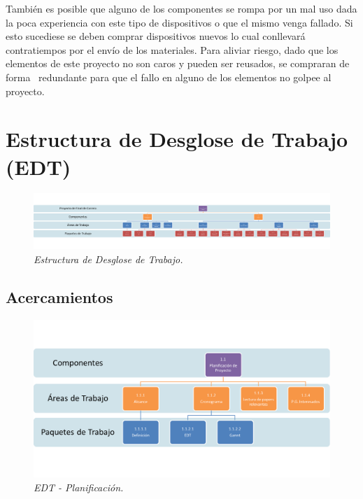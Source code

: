 También es posible que alguno de los componentes se rompa por un mal uso dada la poca experiencia con este tipo de dispositivos o que el mismo venga fallado. Si esto sucediese se deben comprar dispositivos nuevos lo cual conllevará contratiempos por el envío de los materiales. Para aliviar riesgo, dado que los elementos de este proyecto no son caros y pueden ser reusados, se compraran de forma  redundante para que el fallo en alguno de los elementos no golpee al proyecto.

\section{Estructura de Desglose de Trabajo (EDT)}

\begin{figure}[H]
  \centering
  \includegraphics[width=\textwidth, keepaspectratio]{images/EDT}
  \caption{\textit{Estructura de Desglose de Trabajo.}}
  \label{fig:edt}
\end{figure}

\subsection{Acercamientos}

\begin{figure}[H]
  \centering
  \includegraphics[width=\textwidth, keepaspectratio]{images/planificacion_edt}
  \caption{\textit{EDT - Planificación.}}
  \label{fig:planificacion_edt}
\end{figure}

